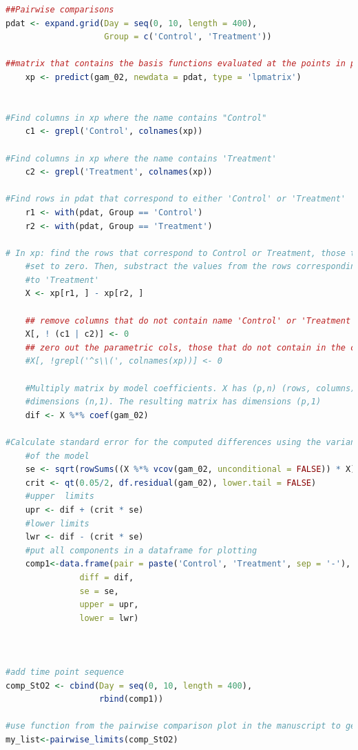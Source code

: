 \documentclass[
]{article}
\begin{document}
\begin{lstlisting}[language=R]
##Pairwise comparisons
pdat <- expand.grid(Day = seq(0, 10, length = 400),
                    Group = c('Control', 'Treatment'))

##matrix that contains the basis functions evaluated at the points in pdat
    xp <- predict(gam_02, newdata = pdat, type = 'lpmatrix')

    
#Find columns in xp where the name contains "Control"
    c1 <- grepl('Control', colnames(xp))

#Find columns in xp where the name contains 'Treatment'
    c2 <- grepl('Treatment', colnames(xp))

#Find rows in pdat that correspond to either 'Control' or 'Treatment'
    r1 <- with(pdat, Group == 'Control')
    r2 <- with(pdat, Group == 'Treatment')

# In xp: find the rows that correspond to Control or Treatment, those that do not match will be
    #set to zero. Then, substract the values from the rows corresponding to 'Control' from those that correspond
    #to 'Treatment'
    X <- xp[r1, ] - xp[r2, ]

    ## remove columns that do not contain name 'Control' or 'Treatment'
    X[, ! (c1 | c2)] <- 0
    ## zero out the parametric cols, those that do not contain in the characters 's('
    #X[, !grepl('^s\\(', colnames(xp))] <- 0

    #Multiply matrix by model coefficients. X has (p,n) (rows, columns) and the coefficient matrix has
    #dimensions (n,1). The resulting matrix has dimensions (p,1)
    dif <- X %*% coef(gam_02)

#Calculate standard error for the computed differences using the variance-covariance matrix
    #of the model
    se <- sqrt(rowSums((X %*% vcov(gam_02, unconditional = FALSE)) * X))
    crit <- qt(0.05/2, df.residual(gam_02), lower.tail = FALSE)
    #upper  limits
    upr <- dif + (crit * se)
    #lower limits
    lwr <- dif - (crit * se)
    #put all components in a dataframe for plotting
    comp1<-data.frame(pair = paste('Control', 'Treatment', sep = '-'),
               diff = dif,
               se = se,
               upper = upr,
               lower = lwr)



#add time point sequence
comp_StO2 <- cbind(Day = seq(0, 10, length = 400),
                   rbind(comp1))

#use function from the pairwise comparison plot in the manuscript to get the shaded regions
my_list<-pairwise_limits(comp_StO2)
 

\end{lstlisting}
\end{document}
